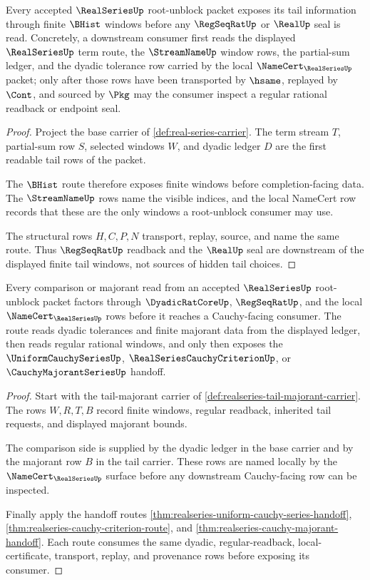 \begin{theorem}
\label{thm:realseries-root-tail-window}
Every accepted $\RealSeriesUp$ root-unblock packet exposes its tail information through finite $\BHist$ windows before any $\RegSeqRatUp$ or $\RealUp$ seal is read. Concretely, a downstream consumer first reads the displayed $\RealSeriesUp$ term route, the $\StreamNameUp$ window rows, the partial-sum ledger, and the dyadic tolerance row carried by the local $\NameCert_{\RealSeriesUp}$ packet; only after those rows have been transported by $\hsame$, replayed by $\Cont$, and sourced by $\Pkg$ may the consumer inspect a regular rational readback or endpoint seal.
\end{theorem}
\begin{proof}
Project the base carrier of \autoref{def:real-series-carrier}. The term stream $T$, partial-sum row $S$, selected windows $W$, and dyadic ledger $D$ are the first readable tail rows of the packet.

The $\BHist$ route therefore exposes finite windows before completion-facing data. The $\StreamNameUp$ rows name the visible indices, and the local NameCert row records that these are the only windows a root-unblock consumer may use.

The structural rows $H,C,P,N$ transport, replay, source, and name the same route. Thus $\RegSeqRatUp$ readback and the $\RealUp$ seal are downstream of the displayed finite tail windows, not sources of hidden tail choices.
\end{proof}

\begin{theorem}
\label{thm:realseries-majorant-route}
Every comparison or majorant read from an accepted $\RealSeriesUp$ root-unblock packet factors through $\DyadicRatCoreUp$, $\RegSeqRatUp$, and the local $\NameCert_{\RealSeriesUp}$ rows before it reaches a Cauchy-facing consumer. The route reads dyadic tolerances and finite majorant data from the displayed ledger, then reads regular rational windows, and only then exposes the $\UniformCauchySeriesUp$, $\RealSeriesCauchyCriterionUp$, or $\CauchyMajorantSeriesUp$ handoff.
\end{theorem}
\begin{proof}
Start with the tail-majorant carrier of \autoref{def:realseries-tail-majorant-carrier}. The rows $W,R,T,B$ record finite windows, regular readback, inherited tail requests, and displayed majorant bounds.

The comparison side is supplied by the dyadic ledger in the base carrier and by the majorant row $B$ in the tail carrier. These rows are named locally by the $\NameCert_{\RealSeriesUp}$ surface before any downstream Cauchy-facing row can be inspected.

Finally apply the handoff routes \autoref{thm:realseries-uniform-cauchy-series-handoff}, \autoref{thm:realseries-cauchy-criterion-route}, and \autoref{thm:realseries-cauchy-majorant-handoff}. Each route consumes the same dyadic, regular-readback, local-certificate, transport, replay, and provenance rows before exposing its consumer.
\end{proof}

